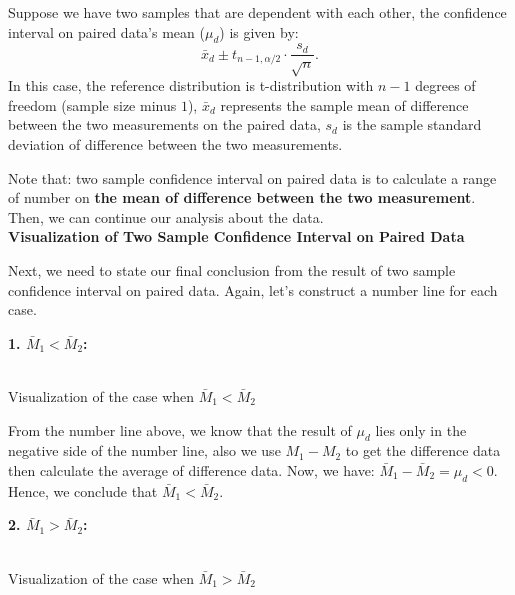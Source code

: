 \begin{definition}
Suppose we have two samples that are dependent with each other, the confidence interval on paired data's mean ($\mu_d$) is given by: \[ \bar{x}_d  \pm t_{n-1, \alpha/2} \cdot \frac{s_d}{\sqrt{n}}.\]
In this case, the reference distribution is t-distribution with $n-1$ degrees of freedom (sample size minus $1$), $\bar{x}_d$ represents the sample mean of difference between the two measurements on the paired data, $s_d$ is the sample standard deviation of difference between the two measurements.
\end{definition}

Note that: two sample confidence interval on paired data is to calculate a range of number on \textbf{the mean of difference between the two measurement}. Then, we can continue our analysis about the data.\\

\textbf{Visualization of Two Sample Confidence Interval on Paired Data}

Next, we need to state our final conclusion from the result of two sample confidence interval on paired data. Again, let's construct a number line for each case.

\textbf{1. $\bar{M}_1 < \bar{M}_2$:}

\begin{center}
\vspace{0.5em}
\small\textbf{}\\Visualization of the case when $\bar{M}_1 < \bar{M}_2$
\end{center}

From the number line above, we know that the result of $\mu_d$ lies only in the negative side of the number line, also we use $M_1 - M_2$ to get the difference data then calculate the average of difference data. Now, we have: $\bar{M}_1 - \bar{M}_2 = \mu_d < 0$. Hence, we conclude that $\bar{M}_1 < \bar{M}_2.$

\textbf{2. $\bar{M}_1 > \bar{M}_2$:}

\begin{center}
\vspace{0.5em}
\small\textbf{}\\Visualization of the case when $\bar{M}_1 > \bar{M}_2$
\end{center}

